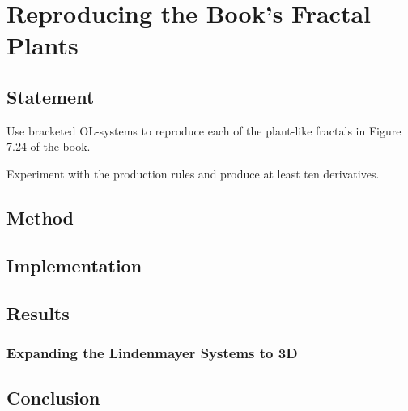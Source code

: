 \section{Reproducing the Book's Fractal Plants}

\subsection{Statement}
Use bracketed OL-systems to reproduce each of the plant-like fractals in Figure 7.24 of the book.

Experiment with the production rules and produce at least ten derivatives.

\subsection{Method}

\subsection{Implementation}

\subsection{Results}

\subsubsection{Expanding the Lindenmayer Systems to 3D}

\subsection{Conclusion}
